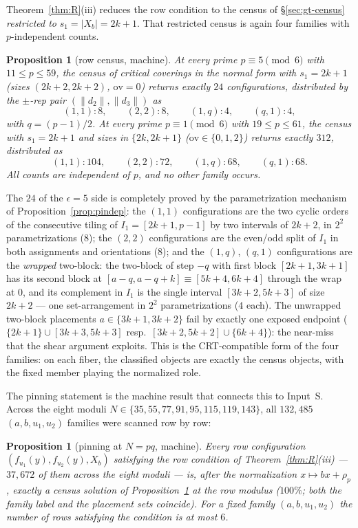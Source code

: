 \documentclass[11pt,a4paper]{article}
\numberwithin{equation}{section}
\theoremstyle{plain}
\theoremstyle{plain}
\newtheorem{proposition}[theorem]{Proposition}
\theoremstyle{definition}
\theoremstyle{remark}
\begin{document}
Theorem~\ref{thm:R}(iii) reduces the row condition to the census of
\S\ref{sec:gt-census} \emph{restricted to} $s_1=|X_b|=2k+1$. That restricted
census is again four families with $p$-independent counts.

\begin{proposition}[row census, machine]\label{prop:rowcensus}
At every prime $p\equiv5\pmod6$ with $11\le p\le59$, the census of critical
coverings in the normal form with $s_1=2k+1$ (sizes $(2k{+}2,2k{+}2)$,
$\mathrm{ov}=0$) returns exactly $24$ configurations, distributed by the
$\pm$-rep pair $(\|d_2\|,\|d_3\|)$ as
\[
(1,1):8,\qquad(2,2):8,\qquad(1,q):4,\qquad(q,1):4,
\]
with $q=(p-1)/2$. At every prime $p\equiv1\pmod6$ with $19\le p\le61$, the
census with $s_1=2k+1$ and sizes in $\{2k,2k+1\}$ ($\mathrm{ov}\in\{0,1,2\}$)
returns exactly $312$, distributed as
\[
(1,1):104,\qquad(2,2):72,\qquad(1,q):68,\qquad(q,1):68.
\]
All counts are independent of $p$, and no other family occurs.
\end{proposition}

The $24$ of the $\epsilon=5$ side is completely proved by the parametrization
mechanism of Proposition~\ref{prop:pindep}: the $(1,1)$ configurations are the two
cyclic orders of the consecutive tiling of $I_1=[2k+1,p-1]$ by two intervals
of $2k+2$, in $2^2$ parametrizations ($8$); the $(2,2)$ configurations are
the even/odd split of $I_1$ in both assignments and orientations ($8$); and
the $(1,q)$, $(q,1)$ configurations are the \emph{wrapped} two-block: the
two-block of step $-q$ with first block $[2k+1,3k+1]$ has its second block at
$[a-q,a-q+k]\equiv[5k+4,6k+4]$ through the wrap at $0$, and its complement
in $I_1$ is the single interval $[3k+2,5k+3]$ of size $2k+2$ --- one
set-arrangement in $2^2$ parametrizations ($4$ each). The unwrapped two-block
placements $a\in\{3k+1,3k+2\}$ fail by exactly one exposed endpoint
($\{2k+1\}\cup[3k{+}3,5k{+}3]$ resp.\ $[3k{+}2,5k{+}2]\cup\{6k{+}4\}$): the
near-miss that the shear argument exploits. This is the CRT-compatible form
of the four families: on each fiber, the classified objects are exactly the
census objects, with the fixed member playing the normalized role.

The pinning statement is the machine result that connects this to
Input~S. Across the eight moduli
$N\in\{35,55,77,91,95,115,119,143\}$, all $132{,}485$ $(a,b,u_1,u_2)$
families were scanned row by row:

\begin{proposition}[pinning at $N=pq$, machine]\label{prop:pqpinned}
Every row configuration $(f_{u_1}(y),f_{u_2}(y),X_b)$ satisfying the row
condition of Theorem~\emph{\ref{thm:R}(iii)} --- $37{,}672$ of them across
the eight moduli --- is, after the normalization $x\mapsto bx+\rho_p$,
\emph{exactly} a census solution of Proposition~\ref{prop:rowcensus} at the
row modulus ($100\%$; both the family label and the placement sets coincide).
For a fixed family $(a,b,u_1,u_2)$ the number of rows satisfying the
condition is at most $6$.
\end{proposition}
\end{document}
